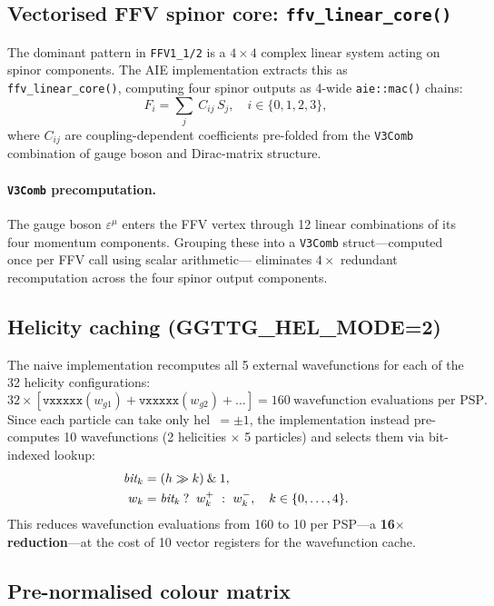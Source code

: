 \subsection{Vectorised FFV spinor core: \texttt{ffv\_linear\_core()}}

The dominant pattern in \texttt{FFV1\_1/2} is a $4\times 4$ complex linear
system acting on spinor components.  The AIE implementation extracts this as
\texttt{ffv\_linear\_core()}, computing four spinor outputs as 4-wide
\texttt{aie::mac()} chains:
\begin{equation}
  F_i = \sum_{j}\ C_{ij}\, S_j, \quad i\in\{0,1,2,3\},
\end{equation}
where $C_{ij}$ are coupling-dependent coefficients pre-folded from the
\texttt{V3Comb} combination of gauge boson and Dirac-matrix structure.

\paragraph{\texttt{V3Comb} precomputation.}
The gauge boson $\varepsilon^\mu$ enters the FFV vertex through 12 linear
combinations of its four momentum components.  Grouping these into a
\texttt{V3Comb} struct---computed once per FFV call using scalar arithmetic---
eliminates $4\times$ redundant recomputation across the four spinor output
components.

\subsection{Helicity caching (GGTTG\_HEL\_MODE=2)}

The naive implementation recomputes all 5 external wavefunctions for each of
the 32 helicity configurations:
\[
  32 \times [ \texttt{vxxxxx}(w_{g1}) + \texttt{vxxxxx}(w_{g2}) + \ldots ] =
  160\ \text{wavefunction evaluations per PSP.}
\]
Since each particle can take only hel~$=\pm 1$, the implementation instead
pre-computes 10 wavefunctions (2 helicities $\times$ 5 particles) and selects
them via bit-indexed lookup:
\begin{align}
  \textit{bit}_{k} &= (h \gg k) \mathbin{\&} 1, \notag \\
  w_k &= \textit{bit}_{k} \mathbin{?}\ w_k^{+}\ :\ w_k^{-},
  \quad k\in\{0,\ldots,4\}.
\end{align}
This reduces wavefunction evaluations from 160 to 10 per PSP---a \textbf{16$\times$
reduction}---at the cost of 10 vector registers for the wavefunction cache.

\subsection{Pre-normalised colour matrix}

